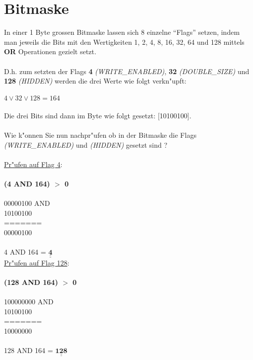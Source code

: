 \documentclass[a4paper,10pt]{article}
\def\doubleunderline#1{\underline{\underline{#1}}}
\begin{document}
\section{Bitmaske}
In einer 1 Byte grossen Bitmaske lassen sich 8 einzelne ``Flags'' setzen, indem man jeweils die Bits mit den Wertigkeiten 1, 2, 4, 8, 16, 32, 64 und 128 mittels \textbf{OR} Operationen gezielt setzt. \\ \\
D.h. zum setzten der Flags \textbf{4} \textit{(WRITE\_ENABLED)}, \textbf{32} \textit{(DOUBLE\_SIZE)} und \textbf{128} \textit{(HIDDEN)} werden die drei Werte wie folgt verkn"upft: \\ \\
$4 \lor  32 \lor 128 = 164$ \\ \\
Die drei Bits sind dann im Byte wie folgt gesetzt: [10100100]. \\ \\
Wie k"onnen Sie nun nachpr"ufen ob in der Bitmaske die Flags \textit{(WRITE\_ENABLED)} und \textit{(HIDDEN)} gesetzt sind ? \\ \\
	 {\color{ForestGreen}
		\underline{Pr"ufen auf Flag 4}: \\ \\
		\textbf{(4 AND 164) $\mathbf{>}$ 0} \\ \\
		00000100 AND \\
		10100100 \\
		======= \\
		00000100 \\ \\ 
		4 AND 164 = $\mathbf{\doubleunderline{4}}$ \\
		
		\underline{Pr"ufen auf Flag 128}: \\ \\
		\textbf{(128 AND 164) $\mathbf{>}$ 0} \\ \\
		100000000 AND \\
		10100100 \\
		======= \\
		10000000 \\ \\ 
		128 AND 164 = $\mathbf{\doubleunderline{128}}$ \\
	 }
\end{document}
